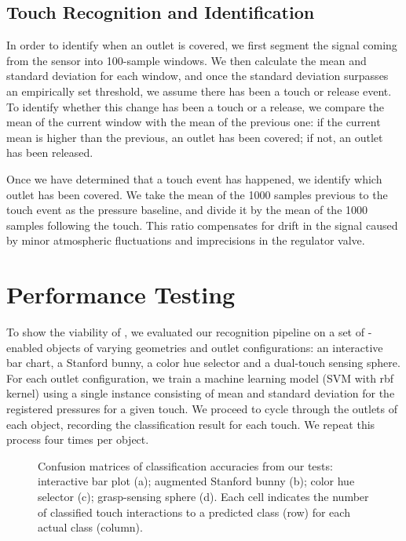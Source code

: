 		\subsection{Touch Recognition and Identification}
			In order to identify when an outlet is covered, we first segment the
			signal coming from the sensor into 100-sample windows. We then calculate
			the mean and standard deviation for each window, and once the standard
			deviation surpasses an empirically set threshold, we assume there has been
			a touch or release event. To identify whether this change has been a touch
			or a release, we compare the mean of the current window with the mean of
			the previous one: if the current mean is higher than the previous, an
			outlet has been covered; if not, an outlet has been released.
					
			\newpage
			Once we have determined that a touch event has happened, we identify which
			outlet has been covered. We take the mean of the 1000 samples previous to
			the touch event as the pressure baseline, and divide it by the mean of the
			1000 samples following the touch. This ratio compensates for drift in the
			signal caused by minor atmospheric fluctuations and imprecisions in the
			regulator valve.

    \section{Performance Testing}
			To show the viability of \at, we evaluated our recognition pipeline on a
			set of \at-enabled objects of varying geometries and outlet
			configurations: an interactive bar chart, a Stanford bunny, a color hue
			selector and a dual-touch sensing sphere.  For each outlet configuration,
			we train a machine learning model (SVM with rbf kernel) using a single
			instance consisting of mean and standard deviation for the registered
			pressures for a given touch. We proceed to cycle through the outlets of
			each object, recording the classification result for each touch. We repeat
			this process four times per object.
        
			\begin{figure}[h]
				\centering
				 \hfill

				\caption{Confusion matrices of classification accuracies from our tests:
					interactive bar plot (a); augmented Stanford bunny (b); color hue
					selector (c); grasp-sensing sphere (d). Each cell indicates the number
					of classified touch interactions to a predicted class (row) for each
					actual class (column).}
				\label{fig:confusion-matrices}%
			\end{figure}

